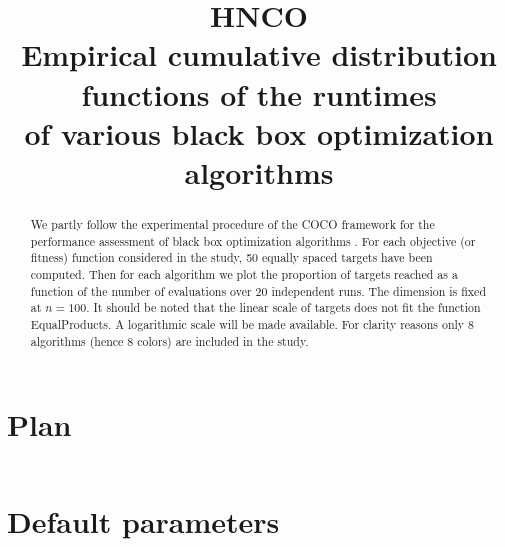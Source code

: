 \documentclass[a4paper]{article}
\begin{document}
%



\title{HNCO\\
  Empirical cumulative distribution functions of the runtimes \\
  of various black box optimization algorithms}
\maketitle

\begin{abstract}
  We partly follow the experimental procedure of the COCO framework
  for the performance assessment of black box optimization algorithms
  \cite{DBLP:journals/corr/HansenABTT16}. For each objective (or
  fitness) function considered in the study, 50 equally spaced targets
  have been computed. Then for each algorithm we plot the proportion
  of targets reached as a function of the number of evaluations over
  20 independent runs. The dimension is fixed at $n=100$. It should be
  noted that the linear scale of targets does not fit the function
  EqualProducts. A logarithmic scale will be made available. For
  clarity reasons only 8 algorithms (hence 8 colors) are included in
  the study.
\end{abstract}

\tableofcontents



 

\appendix

\section{Plan}

\inputminted[breaklines=true]{json}{../plan-compact.json}

\section{Default parameters}

\inputminted[breaklines=true]{text}{../log.default}
\end{document}
